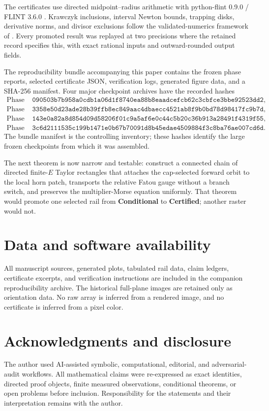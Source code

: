 \documentclass[11pt]{article}
\theoremstyle{definition}
\theoremstyle{remark}
\newcommand{\status}[1]{\textsf{\textbf{#1}}}
\begin{document}
The certificates use directed midpoint--radius arithmetic with python-flint 0.9.0 / FLINT 3.6.0 \citep{Johansson2017Arb,FLINT2026}.  Krawczyk inclusions, interval Newton bounds, trapping disks, derivative norms, and divisor exclusions follow the validated-numerics framework of \citet{Krawczyk1969,MooreKearfottCloud2009,Rump2010}.  Every promoted result was replayed at two precisions where the retained record specifies this, with exact rational inputs and outward-rounded output fields.

The reproducibility bundle accompanying this paper contains the frozen phase reports, selected certificate JSON, verification logs, generated figure data, and a SHA-256 manifest.  Four major checkpoint archives have the recorded hashes
\begin{align*}
\text{Phase 3H: }&\texttt{090503b7b958a0cdb1a06d1f8740ea88b8eaadcefcb62c3cbfce3bbe92523dd2},\\
\text{Phase 3J: }&\texttt{3358e50d23ade28b39ffb8ec849aac4dbaecc4521ab8f9b0bd78d98417fc9b7d},\\
\text{Phase 3K: }&\texttt{143e0a82a8d854d09d58206f01c9a5af6e0c44c5b20c36b913a28491f4319f55},\\
\text{Phase 3L: }&\texttt{3c6d2111535c199b1471e0b67b70091d8b45edae4509884f3c8ba76ae007cd6d}.
\end{align*}
The bundle manifest is the controlling inventory; these hashes identify the large frozen checkpoints from which it was assembled.

The next theorem is now narrow and testable: construct a connected chain of directed finite-$E$ Taylor rectangles that attaches the cap-selected forward orbit to the local horn patch, transports the relative Fatou gauge without a branch switch, and preserves the multiplier-Morse equation uniformly.  That theorem would promote one selected rail from \status{Conditional} to \status{Certified}; another raster would not.

\section*{Data and software availability}

All manuscript sources, generated plots, tabulated rail data, claim ledgers, certificate excerpts, and verification instructions are included in the companion reproducibility archive.  The historical full-plane images are retained only as orientation data.  No raw array is inferred from a rendered image, and no certificate is inferred from a pixel color.

\section*{Acknowledgments and disclosure}

The author used AI-assisted symbolic, computational, editorial, and adversarial-audit workflows.  All mathematical claims were re-expressed as exact identities, directed proof objects, finite measured observations, conditional theorems, or open problems before inclusion.  Responsibility for the statements and their interpretation remains with the author.



\end{document}
